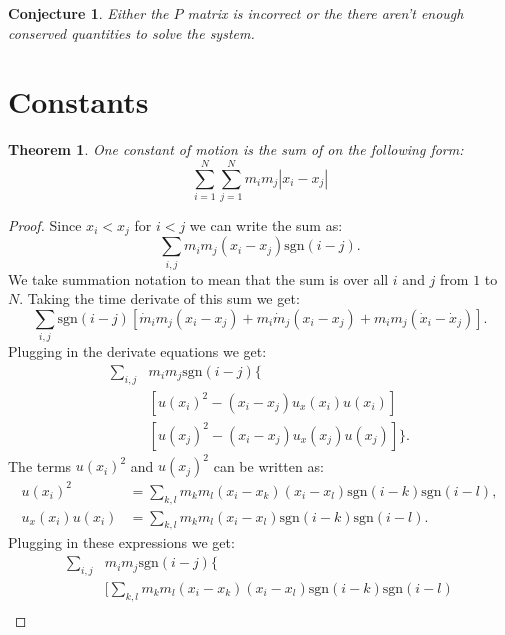 \documentclass[english,master]{liumaiex}
\theoremstyle{plain}
\newtheorem{theorem}[proposition]{Theorem}
\newtheorem{conjecture}[proposition]{Conjecture}
\theoremstyle{definition}
\newcommand{\sgn}{\text{sgn}}
\begin{document}
\begin{conjecture}
Either the $P$ matrix is incorrect or the there aren't enough conserved quantities to solve the system.
\end{conjecture}

\section{Constants}

\begin{theorem}
	One constant of motion is the sum of on the following form:	
	\begin{equation}
		\sum_{i=1}^{N}\sum_{j=1}^N m_i m_j |x_i - x_j|
	\end{equation}
\end{theorem}
\begin{proof}
	Since $x_i < x_j$ for $i < j$ we can write the sum as:
	\begin{equation}
		\sum_{i,j} m_i m_j (x_i - x_j) \sgn(i - j).
	\end{equation}
	We take summation notation to mean that the sum is over all $i$ and $j$ from $1$ to $N$.
	Taking the time derivate of this sum we get:
	\begin{equation}
		\sum_{i,j} \sgn(i - j)[
			\dot{m}_i m_j (x_i - x_j) 
			+ m_i \dot{m}_j (x_i - x_j)
			+ m_i m_j (\dot{x}_i - \dot{x}_j)].
	\end{equation}
	Plugging in the derivate equations we get:
	\begin{equation}
	\begin{aligned}
		\sum_{i,j} & m_i m_j \sgn(i - j) \{ \\
			& [u(x_i)^2 - (x_i - x_j) u_x(x_i) u(x_i)] \\
			& [u(x_j)^2 - (x_i - x_j) u_x(x_j) u(x_j)]\}.
	\end{aligned}
	\end{equation}
	The terms $u(x_i)^2$ and $u(x_j)^2$ can be written as:
	\begin{align}
		u(x_i)^2 &= \sum_{k,l} m_k m_l (x_i - x_k) (x_i - x_l) \sgn(i - k) \sgn(i - l), \\
		u_x(x_i) u(x_i) &= \sum_{k,l} m_k m_l (x_i - x_l) \sgn(i - k) \sgn(i - l).
	\end{align}
	Plugging in these expressions we get:
	\begin{equation}
	\begin{aligned}
		\sum_{i,j} &m_i m_j \sgn(i - j) \{\\
			&[\sum_{k,l} m_k m_l (x_i - x_k) (x_i - x_l) \sgn(i - k) \sgn(i - l)\\

\end{aligned}
\end{equation}
\end{proof}
\end{document}
